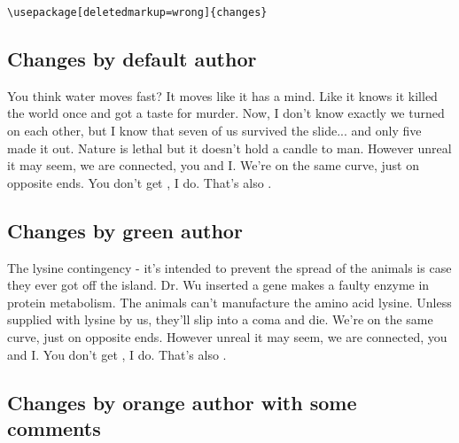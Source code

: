 \documentclass[11pt, a4paper, notitlepage, english]{article}
\begin{document}
\verb|\usepackage[deletedmarkup=wrong]{changes}|


















\subsection*{Changes by default author}

You think water moves fast?
It moves like it has a mind.
Like it knows it killed the world once and got a taste for murder.
Now, I don't know exactly  we turned on each other, but I know that seven of us survived the slide... and only five made it out.
Nature is lethal but it doesn't hold a candle to man.
However unreal it may seem, we are connected, you and I.
We're on the same curve, just on opposite ends.
You don't get , I do.
That's also .

\subsection*{Changes by green author}

The lysine contingency - it's intended to prevent the spread of the animals is case they ever got off the island.
Dr. Wu inserted a gene  makes a  faulty enzyme in protein metabolism.
The animals can't manufacture the amino acid lysine.
Unless  supplied with lysine by us, they'll slip into a coma and die.
We're on the same curve, just on opposite ends.
However unreal it may seem, we are connected, you and I.
You don't get , I do.
That's also .

\subsection*{Changes by orange author with some comments}
\end{document}
